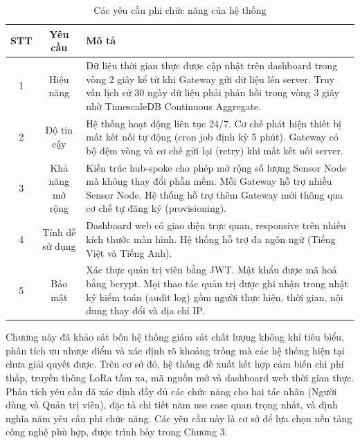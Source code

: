 \documentclass[../DoAn.tex]{subfiles}
\begin{document}
\begin{table}[H]
\centering
\caption{Các yêu cầu phi chức năng của hệ thống}
\label{table:nfr}
\small
\begin{tabularx}{\textwidth}{|c|c|X|}
\hline
\textbf{STT} & \textbf{Yêu cầu} & \textbf{Mô tả} \\
\hline
1 & Hiệu năng & Dữ liệu thời gian thực được cập nhật trên dashboard trong vòng 2 giây kể từ khi Gateway gửi dữ liệu lên server. Truy vấn lịch sử 30 ngày dữ liệu phải phản hồi trong vòng 3 giây nhờ TimescaleDB Continuous Aggregate. \\
\hline
2 & Độ tin cậy & Hệ thống hoạt động liên tục 24/7. Cơ chế phát hiện thiết bị mất kết nối tự động (cron job định kỳ 5 phút). Gateway có bộ đệm vòng và cơ chế gửi lại (retry) khi mất kết nối server. \\
\hline
3 & Khả năng mở rộng & Kiến trúc hub-spoke cho phép mở rộng số lượng Sensor Node mà không thay đổi phần mềm. Mỗi Gateway hỗ trợ nhiều Sensor Node. Hệ thống hỗ trợ thêm Gateway mới thông qua cơ chế tự đăng ký (provisioning). \\
\hline
4 & Tính dễ sử dụng & Dashboard web có giao diện trực quan, responsive trên nhiều kích thước màn hình. Hệ thống hỗ trợ đa ngôn ngữ (Tiếng Việt và Tiếng Anh). \\
\hline
5 & Bảo mật & Xác thực quản trị viên bằng JWT. Mật khẩu được mã hoá bằng bcrypt. Mọi thao tác quản trị được ghi nhận trong nhật ký kiểm toán (audit log) gồm người thực hiện, thời gian, nội dung thay đổi và địa chỉ IP. \\
\hline
\end{tabularx}
\end{table}

Chương này đã khảo sát bốn hệ thống giám sát chất lượng không khí tiêu biểu, phân tích ưu nhược điểm và xác định rõ khoảng trống mà các hệ thống hiện tại chưa giải quyết được. Trên cơ sở đó, hệ thống đề xuất kết hợp cảm biến chi phí thấp, truyền thông LoRa tầm xa, mã nguồn mở và dashboard web thời gian thực. Phân tích yêu cầu đã xác định đầy đủ các chức năng cho hai tác nhân (Người dùng và Quản trị viên), đặc tả chi tiết năm use case quan trọng nhất, và định nghĩa năm yêu cầu phi chức năng. Các yêu cầu này là cơ sở để lựa chọn nền tảng công nghệ phù hợp, được trình bày trong Chương 3.

\end{document}

